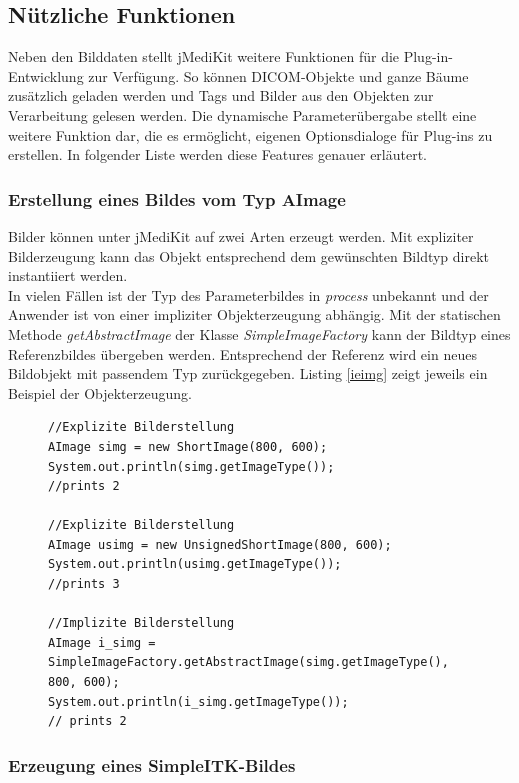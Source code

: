 \FloatBarrier
\pagebreak
\subsection{Nützliche Funktionen}

Neben den Bilddaten stellt jMediKit weitere Funktionen für die Plug-in-Entwicklung zur Verfügung. So können DICOM-Objekte und ganze Bäume zusätzlich geladen werden und Tags und Bilder aus den Objekten zur Verarbeitung gelesen werden. Die dynamische Parameterübergabe stellt eine weitere Funktion dar, die es ermöglicht, eigenen Optionsdialoge für Plug-ins zu erstellen. In folgender Liste werden diese Features genauer erläutert.

\subsubsection{Erstellung eines Bildes vom Typ AImage}
Bilder können unter jMediKit auf zwei Arten erzeugt werden. Mit expliziter Bilderzeugung kann das Objekt entsprechend dem gewünschten Bildtyp direkt instantiiert werden.\\
In vielen Fällen ist der Typ des Parameterbildes in \textit{process} unbekannt und der Anwender ist von einer impliziter Objekterzeugung abhängig. Mit der statischen Methode \textit{get\-AbstractImage} der Klasse \textit{SimpleImageFactory} kann der Bildtyp eines Referenzbildes übergeben werden. Entsprechend der Referenz wird ein neues Bildobjekt mit passendem Typ zurückgegeben. Listing \ref{ieimg} zeigt jeweils ein Beispiel der Objekterzeugung.

\begin{figure}[htbp]
\begin{lstlisting}[frame=leftline]
//Explizite Bilderstellung
AImage simg = new ShortImage(800, 600);
System.out.println(simg.getImageType());
//prints 2

//Explizite Bilderstellung
AImage usimg = new UnsignedShortImage(800, 600);
System.out.println(usimg.getImageType());
//prints 3
		
//Implizite Bilderstellung
AImage i_simg = SimpleImageFactory.getAbstractImage(simg.getImageType(), 800, 600);
System.out.println(i_simg.getImageType());
// prints 2
\end{lstlisting}
\end{figure}

\subsubsection{Erzeugung eines SimpleITK-Bildes}

